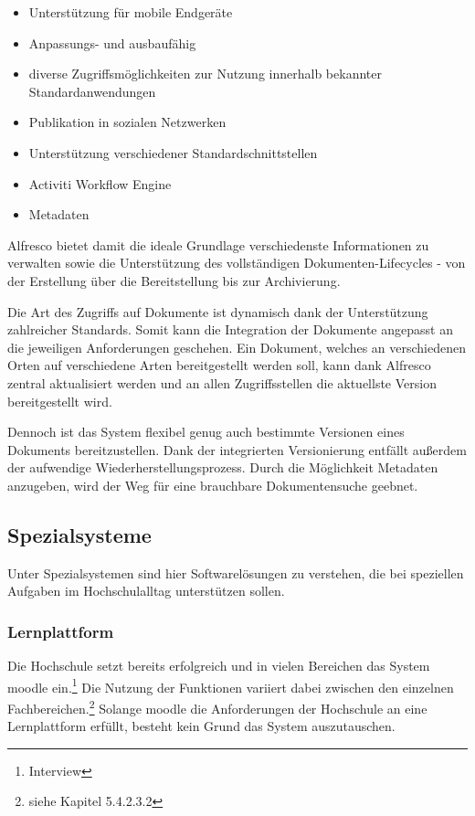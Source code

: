 \begin{itemize}
	\item Unterstützung für mobile Endgeräte
	\item Anpassungs- und ausbaufähig
	\item diverse Zugriffsmöglichkeiten zur Nutzung innerhalb bekannter Standardanwendungen
	\item Publikation in sozialen Netzwerken
	\item Unterstützung verschiedener Standardschnittstellen
	\item Activiti Workflow Engine
	\item Metadaten
\end{itemize}

Alfresco bietet damit die ideale Grundlage verschiedenste Informationen zu verwalten sowie die Unterstützung des vollständigen Dokumenten-Lifecycles - von der Erstellung über die Bereitstellung bis zur Archivierung. 

Die Art des Zugriffs auf Dokumente ist dynamisch dank der Unterstützung zahlreicher Standards. Somit kann die Integration der Dokumente angepasst an die jeweiligen Anforderungen geschehen. Ein Dokument, welches an verschiedenen Orten auf verschiedene Arten bereitgestellt werden soll, kann dank Alfresco zentral aktualisiert werden und an allen Zugriffsstellen die aktuellste Version bereitgestellt wird.

Dennoch ist das System flexibel genug auch bestimmte Versionen eines Dokuments bereitzustellen. Dank der integrierten Versionierung entfällt außerdem der aufwendige Wiederherstellungsprozess. Durch die Möglichkeit Metadaten anzugeben, wird der Weg für eine brauchbare Dokumentensuche geebnet.

\subsection{Spezialsysteme}
Unter Spezialsystemen sind hier Softwarelösungen zu verstehen, die bei speziellen Aufgaben im Hochschulalltag unterstützen sollen.

\subsubsection{Lernplattform}
Die Hochschule setzt bereits erfolgreich und in vielen Bereichen das System moodle ein.\footnote{Interview} Die Nutzung der Funktionen variiert dabei zwischen den einzelnen Fachbereichen.\footnote{siehe Kapitel 5.4.2.3.2}
Solange moodle die Anforderungen der Hochschule an eine Lernplattform erfüllt, besteht kein Grund das System auszutauschen.

